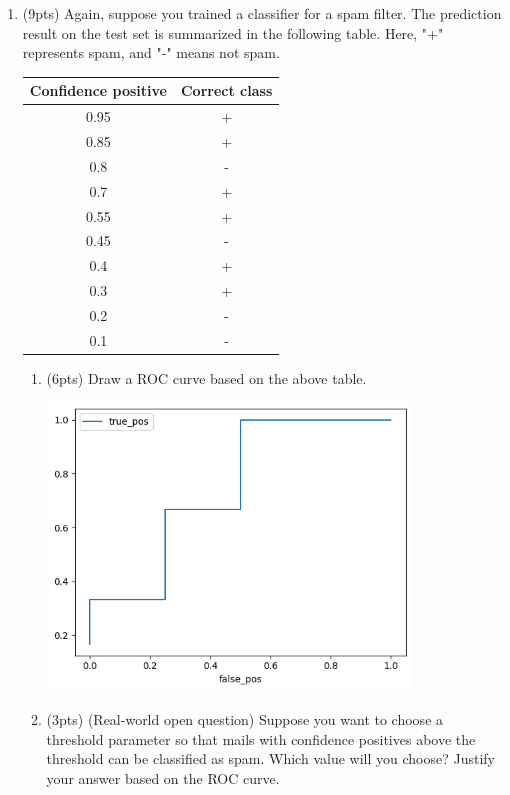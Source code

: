 \documentclass[a4paper]{article}
\theoremstyle{definition}
\newenvironment{soln}{
    \leavevmode\color{blue}\ignorespaces
}{}
\begin{document}
\begin{enumerate}
\item (9pts) Again, suppose you trained a classifier for a spam filter. The prediction result on the test set is summarized in the following table. Here, "+" represents spam, and "-" means not spam.

\begin{center}
\begin{tabular}{ c  c }
\hline
Confidence positive & Correct class \\ \hline
0.95 & + \\
0.85 & + \\
0.8 & - \\
0.7 & + \\
0.55 & + \\
0.45 & - \\
0.4 & + \\
0.3 & + \\
0.2 & - \\
0.1 & - \\
\hline
\end{tabular}
\end{center}

\begin{enumerate}
	\item (6pts) Draw a ROC curve based on the above table.
	
	\begin{soln}  
            \includegraphics[width=0.8\textwidth]{hw3/1_5_a.png}\\
        \end{soln}
	
	\item (3pts) (Real-world open question) Suppose you want to choose a threshold parameter so that mails with confidence positives above the threshold can be classified as spam. Which value will you choose? Justify your answer based on the ROC curve.
	

\end{enumerate}
\end{enumerate}
\end{document}
